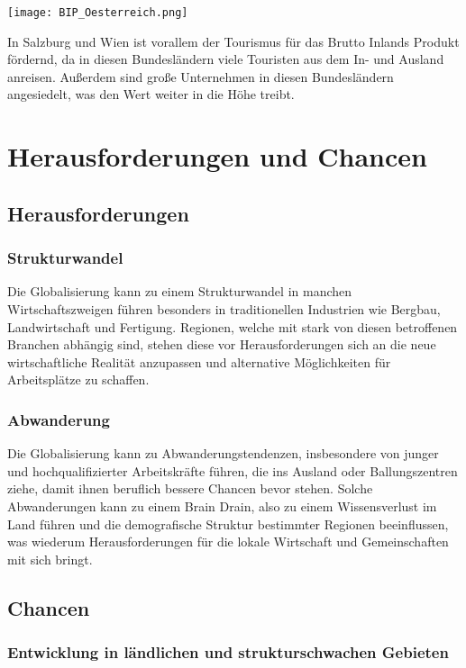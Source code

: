\texttt{[image: BIP\_Oesterreich.png]}

In Salzburg und Wien ist vorallem der Tourismus für das Brutto Inlands Produkt fördernd, da in diesen Bundesländern viele Touristen aus dem In- und Ausland anreisen. Außerdem sind große Unternehmen in diesen Bundesländern angesiedelt, was den Wert weiter in die Höhe treibt.

\section{Herausforderungen und Chancen}

\subsection{Herausforderungen}

\subsubsection{Strukturwandel}

Die Globalisierung kann zu einem Strukturwandel in manchen Wirtschaftszweigen führen besonders in traditionellen Industrien wie Bergbau, Landwirtschaft und Fertigung. Regionen, welche mit stark von diesen betroffenen Branchen abhängig sind, stehen diese vor Herausforderungen sich an die neue wirtschaftliche Realität anzupassen und alternative Möglichkeiten für Arbeitsplätze zu schaffen.

\subsubsection{Abwanderung}

Die Globalisierung kann zu Abwanderungstendenzen, insbesondere von junger und hochqualifizierter Arbeitskräfte führen, die ins Ausland oder Ballungszentren ziehe, damit ihnen beruflich bessere Chancen bevor stehen. Solche Abwanderungen kann zu einem Brain Drain, also zu einem Wissensverlust im Land führen und die demografische Struktur bestimmter Regionen beeinflussen, was wiederum Herausforderungen für die lokale Wirtschaft und Gemeinschaften mit sich bringt.

\subsection{Chancen}

\subsubsection{Entwicklung in ländlichen und strukturschwachen Gebieten}

